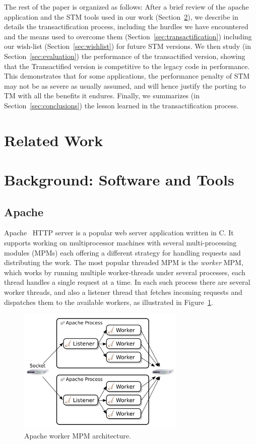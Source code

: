 \documentclass[preprint,11pt]{sigplanconf}
\let \cite = \citep
\begin{document}
The rest of the paper is organized as follows: After a brief review of the
apache application and the STM tools used in our work
(Section~\ref{sec:background}), we describe in details the transactification
process, including the hurdles we have encountered and the means used to
overcome them (Section~\ref{sec:transactification}) including our wish-list
(Section~\ref{sec:wishlist}) for future STM versions. We then study (in
Section~\ref{sec:evaluation}) the performance of the transactified version,
showing that the Transactified version is competitive to the legacy code in
performance. This demonstrates that for some applications, the performance
penalty of STM may not be as severe as usually assumed, and will hence justify
the porting to TM with all the benefits it endures. Finally, we summarizes (in
Section~\ref{sec:conclusions}) the lesson learned in the transactification
process.

\section{Related Work}
\section{Background: Software and Tools}\label{sec:background}
\subsection{Apache}\label{sec:apache}
Apache~\cite{apache} HTTP server is a popular web server application written in
C. It supports working on multiprocessor machines with several multi-processing
modules (MPMs) each offering a different strategy for handling requests and
distributing the work. The most popular threaded MPM is the \emph{worker} MPM,
which works by running multiple worker-threads under several processes, each
thread handles a single request at a time. In each such process there are
several worker threads, and also a listener thread that fetches incoming
requests and dispatches them to the available workers, as illustrated in
Figure~\ref{fig:apache-worker-MPM}.

\begin{figure}
 \begin{center}
  \includegraphics[width=8cm]{Apache-Worker-MPM.png}
 \end{center}
 \caption{Apache worker MPM architecture.}
 \label{fig:apache-worker-MPM}
\end{figure}
\end{document}
